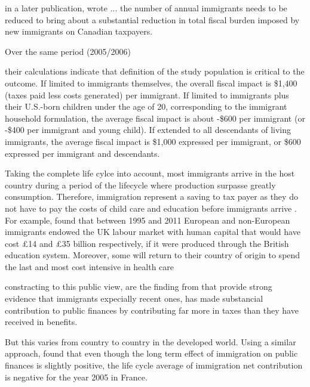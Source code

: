   in a later publication, \citep{grady2015immigration} wrote ... the number of annual immigrants needs to be reduced to bring about a substantial reduction in total fiscal burden imposed by new immigrants on Canadian taxpayers.

  Over the same period (2005/2006) \citep{Javdani:2013gu}




their calculations indicate that definition of the study population is critical to the outcome. If limited to immigrants themselves, the overall fiscal impact is \$1,400 (taxes paid less costs generated) per immigrant. If limited to immigrants plus their U.S.-born children under the age of 20, corresponding to the immigrant household formulation, the average fiscal impact is about -\$600 per immigrant (or -\$400 per immigrant and young child). If extended to all descendants of living immigrants, the average fiscal impact is \$1,000 expressed per immigrant, or \$600 expressed per immigrant and descendants.






  Taking the complete life cylce into account, most immigrants arrive in the host country during a period of the lifecycle where production surpasse greatly consumption. Therefore, immigration represent a saving to tax payer as they do not have to pay the costs of child care and education before immigrants arrive \citep{Bratsberg:2014cl}. For example, \citet{Dustmann:2014dr} found that  between 1995 and 2011 European and non-European immigrants endowed the UK labour market with human capital that would have cost £14 and £35 billion respectively, if it were produced through the British education system. Moreover, some will return to their country of origin to spend the last and most cost intensive in health care \citep{Bratsberg:2014cl}


  constracting to this public view, are the finding from \citep{Dustmann:2014dr} that provide strong evidence that immigrants expecially recent ones, has made substancial contribution to public finances by contributing far more in taxes than they have received in benefits.

  But this varies from country to country in the developed world.
  Using a similar approach, \citep{Chojnicki:2011vu} found that even though the long term effect of immigration on public finances is slightly positive, the life cycle average of immigration net contribution is negative for the year 2005 in France.



